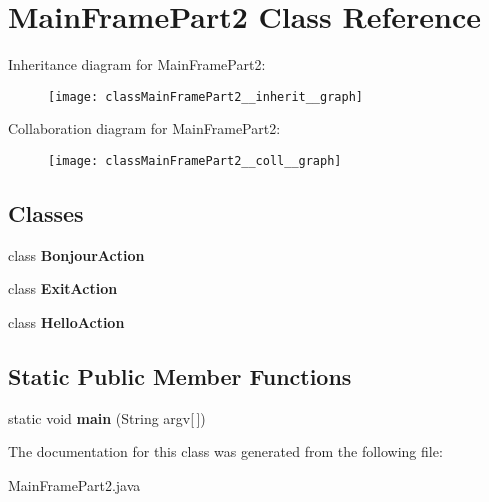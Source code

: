 \hypertarget{classMainFramePart2}{}\section{Main\+Frame\+Part2 Class Reference}
\label{classMainFramePart2}


Inheritance diagram for Main\+Frame\+Part2\+:
\nopagebreak
\begin{figure}[H]
\begin{center}
\leavevmode
\texttt{[image: classMainFramePart2\_\_inherit\_\_graph]}
\end{center}
\end{figure}


Collaboration diagram for Main\+Frame\+Part2\+:
\nopagebreak
\begin{figure}[H]
\begin{center}
\leavevmode
\texttt{[image: classMainFramePart2\_\_coll\_\_graph]}
\end{center}
\end{figure}
\subsection*{Classes}
\begin{DoxyCompactItemize}
\item 
class {\bfseries Bonjour\+Action}
\item 
class {\bfseries Exit\+Action}
\item 
class {\bfseries Hello\+Action}
\end{DoxyCompactItemize}
\subsection*{Static Public Member Functions}
\begin{DoxyCompactItemize}
\item 
\hypertarget{classMainFramePart2_a80b537b240ec1e16ea6b3c9ce4c9d544}{}static void {\bfseries main} (String argv\mbox{[}$\,$\mbox{]})\label{classMainFramePart2_a80b537b240ec1e16ea6b3c9ce4c9d544}

\end{DoxyCompactItemize}


The documentation for this class was generated from the following file\+:\begin{DoxyCompactItemize}
\item 
Main\+Frame\+Part2.\+java\end{DoxyCompactItemize}
